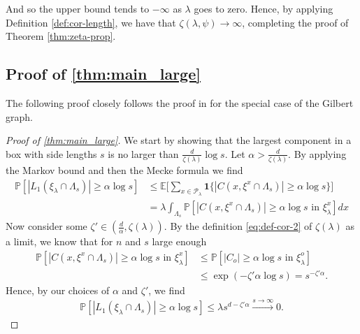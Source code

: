 \documentclass[a4paper,12pt]{scrartcl}
\newcommand{\conn}{\psi}
\newcommand{\E}{\mathbb{E}}
\renewcommand{\P}{\mathbb{P}}
\theoremstyle{definition}
\theoremstyle{remark}
\begin{document}
  And so the upper bound tends to $-\infty$ as $\lambda$ goes to zero. Hence, by applying Definition \ref{def:cor-length}, we have that $\zeta(\lambda, \conn)\to\infty$, completing the proof of Theorem \ref{thm:zeta-prop}.

  \subsection{Proof of \autoref{thm:main_large}}
  The following proof closely follows the proof in
  \cite[Theorem 10.3]{penrose2003random} for the special case of
  the Gilbert graph.
  \begin{proof}[Proof of \autoref{thm:main_large}]
    We start by showing that the largest component in a box with side lengths $s$ is no larger than $\frac{d}{\zeta(\lambda)}\log s$. Let $\alpha > \frac{d}{\zeta(\lambda)}$. By applying the Markov bound and then the Mecke formula we find
    \begin{align*}
      \P[
        |L_1(\mathcal \xi_{\lambda}\cap \Lambda_s)|
        \geq
        \alpha \log s
      ]
      & \leq
      \E \Big[
        \sum_{x\in\mathcal P_\lambda}
        \mathbf{1}\{|C(x, \xi^x\cap\Lambda_s)|\geq \alpha\log s\}
      \Big]
      \\
      & =
      \lambda\int_{\Lambda_s}
      \P[
        |C(x, \xi^x\cap\Lambda_s)|\geq\alpha \log s \text{ in }\xi^x_{\lambda}
      ]
      dx
    \end{align*}
    Now consider some $\zeta'\in(\frac d\alpha,\zeta(\lambda))$. By the
    definition \eqref{eq:def-cor-2} of $\zeta(\lambda)$ as a limit, we know that for $n$ and $s$ large enough
    \begin{align*}
      \P[|C(x, \xi^x\cap\Lambda_s)|\geq\alpha \log s\text{ in }\xi^x_{\lambda}]
      & \leq
      \P[|C_o|\geq \alpha \log s\text{ in }\xi^o_{\lambda}]
      \\
      & \leq
      \exp(-\zeta'\alpha \log s) = s^{-\zeta'\alpha}.
    \end{align*}
    Hence, by our choices of $\alpha$ and $\zeta'$, we find
    \begin{align*}
      \P[|L_1(\mathcal \xi_{\lambda}\cap \Lambda_s)|
        \geq
        \alpha \log s
      ]
      \leq
      \lambda s^{d-\zeta'\alpha}\xrightarrow{s\to\infty}0.
    \end{align*}


\end{proof}
\end{document}
